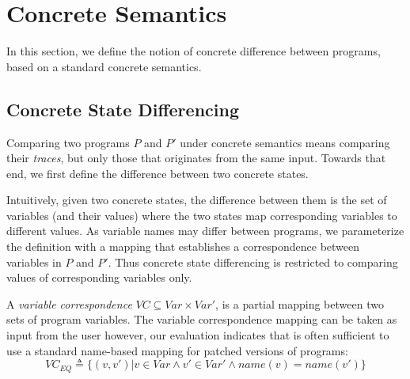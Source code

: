 \section{Concrete Semantics}
In this section, we define the notion of concrete difference between programs, based on a standard concrete semantics.

\subsection{Concrete State Differencing}
Comparing two programs $P$ and $P'$ under concrete semantics means comparing their \emph{traces}, but only those that originates from the same input. Towards that end, we first define the difference between two concrete states.

Intuitively, given two concrete states, the difference between them is the set of variables (and their values) where the two states map corresponding variables to different values. As variable names may differ between programs, we parameterize the definition with a mapping that establishes a correspondence between variables in $P$ and $P'$. Thus concrete state differencing is restricted to comparing values of corresponding variables only.

A \emph{variable correspondence} $VC \subseteq Var \times Var'$, is a partial mapping between two sets of program variables. The variable correspondence mapping can be taken as input from the user however, our evaluation indicates that is often sufficient to use a standard name-based mapping for patched versions of programs:
\[
VC_{EQ} \triangleq \{(v,v') | v \in Var \wedge v' \in Var' \wedge name(v) = name(v')\}
\]


